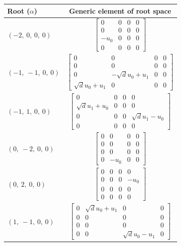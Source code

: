 \documentclass[11pt]{article}
\theoremstyle{definition}
\begin{document}
\noindent \begin{tabular}{|l|c|}
    \hline
    \textbf{Root ($\alpha$)} & \textbf{Generic element of root space} \\
    \hline
    $\left( -2, \  0, \  0, \  0\right)$ & $\left[\begin{matrix}0 & 0 & 0 & 0\\0 & 0 & 0 & 0\\- u_{0} & 0 & 0 & 0\\0 & 0 & 0 & 0\end{matrix}\right]$ \\
    \hline
    $\left( -1, \  -1, \  0, \  0\right)$ & $\left[\begin{matrix}0 & 0 & 0 & 0\\0 & 0 & 0 & 0\\0 & - \sqrt{d} u_{0} + u_{1} & 0 & 0\\\sqrt{d} u_{0} + u_{1} & 0 & 0 & 0\end{matrix}\right]$ \\
    \hline
    $\left( -1, \  1, \  0, \  0\right)$ & $\left[\begin{matrix}0 & 0 & 0 & 0\\\sqrt{d} u_{1} + u_{0} & 0 & 0 & 0\\0 & 0 & 0 & \sqrt{d} u_{1} - u_{0}\\0 & 0 & 0 & 0\end{matrix}\right]$ \\
    \hline
    $\left( 0, \  -2, \  0, \  0\right)$ & $\left[\begin{matrix}0 & 0 & 0 & 0\\0 & 0 & 0 & 0\\0 & 0 & 0 & 0\\0 & - u_{0} & 0 & 0\end{matrix}\right]$ \\
    \hline
    $\left( 0, \  2, \  0, \  0\right)$ & $\left[\begin{matrix}0 & 0 & 0 & 0\\0 & 0 & 0 & - u_{0}\\0 & 0 & 0 & 0\\0 & 0 & 0 & 0\end{matrix}\right]$ \\
    \hline
    $\left( 1, \  -1, \  0, \  0\right)$ & $\left[\begin{matrix}0 & \sqrt{d} u_{0} + u_{1} & 0 & 0\\0 & 0 & 0 & 0\\0 & 0 & 0 & 0\\0 & 0 & \sqrt{d} u_{0} - u_{1} & 0\end{matrix}\right]$ \\

\end{tabular}
\end{document}
